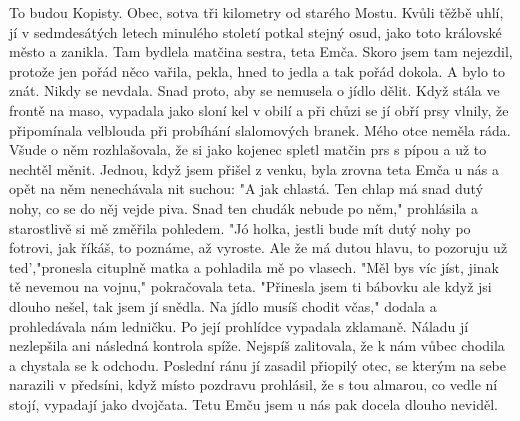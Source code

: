 
To budou Kopisty. Obec, sotva tři kilometry od starého Mostu. Kvůli
těžbě uhlí, jí v sedmdesátých letech minulého století potkal stejný
osud, jako toto královské město a zanikla. Tam bydlela matčina sestra,
teta Emča. Skoro jsem tam nejezdil, protože jen pořád něco vařila,
pekla, hned to jedla a tak pořád dokola. A bylo to znát. Nikdy se
nevdala. Snad proto, aby se nemusela o jídlo dělit. Když stála ve
frontě na maso, vypadala jako sloní kel v obilí a při chůzi se jí obří
prsy vlnily, že připomínala velblouda při probíhání slalomových
branek. Mého otce neměla ráda. Všude o něm rozhlašovala, že si jako
kojenec spletl matčin prs s pípou a už to nechtěl měnit. Jednou, když
jsem přišel z venku, byla zrovna teta Emča u nás a opět na něm
nenechávala nit suchou: "A jak chlastá. Ten chlap má snad dutý nohy,
co se do něj vejde piva. Snad ten chudák nebude po něm," prohlásila a
starostlivě si mě změřila pohledem. "Jó holka, jestli bude mít dutý
nohy po fotrovi, jak říkáš, to poznáme, až vyroste. Ale že má dutou
hlavu, to pozoruju už ted',"pronesla cituplně matka a pohladila mě po
vlasech. "Měl bys víc jíst, jinak tě nevemou na vojnu," pokračovala
teta. "Přinesla jsem ti bábovku ale když jsi dlouho nešel, tak jsem jí
snědla. Na jídlo musíš chodit včas," dodala a prohledávala nám
ledničku. Po její prohlídce vypadala zklamaně. Náladu jí nezlepšila
ani následná kontrola spíže. Nejspíš zalitovala, že k nám vůbec
chodila a chystala se k odchodu. Poslední ránu jí zasadil přiopilý
otec, se kterým na sebe narazili v předsíni, když místo pozdravu
prohlásil, že s tou almarou, co vedle ní stojí, vypadají jako
dvojčata. Tetu Emču jsem u nás pak docela dlouho neviděl.

